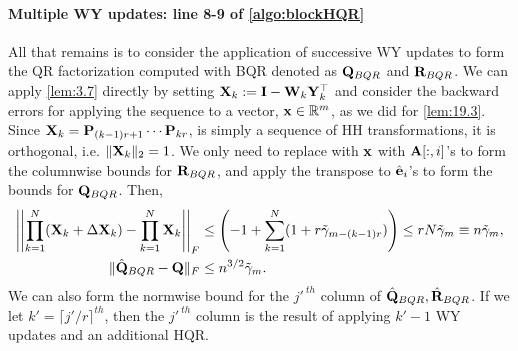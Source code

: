 \paragraph{Multiple WY updates: line 8-9 of \cref{algo:blockHQR}}
All that remains is to consider the application of successive WY updates to form the QR factorization computed with BQR denoted as $\mathbf{Q}_{BQR}$ and $\mathbf{R}_{BQR}$. 
We can apply \cref{lem:3.7} directly by setting $\mathbf{X}_{k}:= \mathbf{I}-\mathbf{W}_{k}\mathbf{Y}_{k}^{\top}$ and consider the backward errors for applying the sequence to a vector, $\mathbf{x}\in\mathbb{R}^{m}$, as we did for \cref{lem:19.3}. 
Since $\mathbf{X}_{k}=\mathbf{P}_{(k-1)r+1}\cdots\mathbf{P}_{kr}$, is simply a sequence of HH transformations, it is orthogonal, i.e. $\|\mathbf{X}_{k}\|_2=1$.
We only need to replace with $\mathbf{x}$ with $\mathbf{A}[:,i]$'s to form the columnwise bounds for $\mathbf{R}_{BQR}$, and apply the transpose to $\hat{\mathbf{e}}_i$'s to form the bounds for $\mathbf{Q}_{BQR}$. 
Then, 
\begin{align}
\left|\left|\prod_{k=1}^N (\bb{X}_{k} + \Delta \bb{X}_{k})- \prod_{k=1}^N\bb{X}_{k} \right|\right|_F &\leq\left(-1+\sum_{k=1}^N (1+r\tilde{\gamma}_{m-(k-1)r})\right) \leq rN\tilde{\gamma}_m \equiv n\tilde{\gamma}_m ,\label{eqn:BQR-mp}\\%
\|\hat{\bb{Q}}_{BQR}-\bb{Q}\|_F&\leq n^{3/2}\tilde{\gamma}_m. \label{eqn:BQR}
\end{align}
We can also form the normwise bound for the $j'^{\ th}$ column of $\hat{\mathbf{Q}}_{BQR},\hat{\mathbf{R}}_{BQR}$. 
If we let $k' = \lceil j'/r\rceil^{th}$, then the $j'^{\ th}$ column is the result of applying $k'-1$ WY updates and an additional HQR. 
